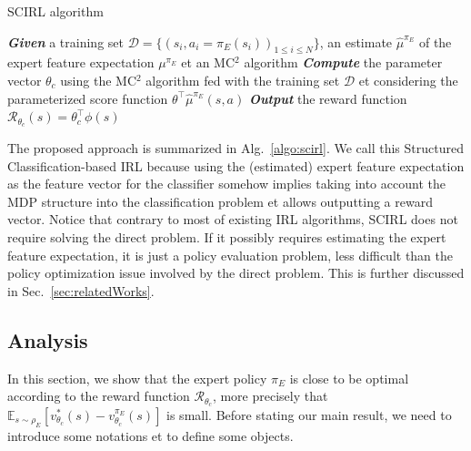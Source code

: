 \documentclass[english,utf8]{./hermes-journal}
\newcommand{\R}{\mathcal{R}}
\newcommand{\D}{\mathcal{D}}
\newcommand{\E}{\mathbb{E}}
\begin{document}
\begin{algorithm2e}%
  \SetAlgoVlined
  \caption{SCIRL algorithm}
  \label{algo:scirl}
  \BlankLine
  \emph{\textbf{Given}} a training set $\D = \{(s_i,a_i=\pi_E(s_i))_{1\leq i\leq N}\}$,
  an estimate $\hat{\mu}^{\pi_E}$ of the expert feature expectation $\mu^{\pi_E}$ et an MC$^2$ algorithm\;
  \BlankLine
  \emph{\textbf{Compute}} the parameter vector $\theta_c$ using the
  MC$^2$ algorithm
  fed with the training set $\D$ et considering the parameterized score function
  $\theta^\top\hat{\mu}^{\pi_E}(s,a)$\;
  \BlankLine
  \emph{\textbf{Output}} the reward function $\R_{\theta_c}(s) = \theta_c^\top\phi(s)$ \;
\end{algorithm2e}

The proposed approach is summarized in Alg.~\ref{algo:scirl}. We
call this Structured Classification-based IRL because using the
(estimated) expert feature expectation as the feature vector for the
classifier somehow implies taking into account the MDP structure
into the classification problem et allows outputting a reward
vector. Notice that contrary to most of existing IRL
algorithms, SCIRL does not require solving the direct problem. If it
possibly requires estimating the expert feature expectation, it is
just a policy evaluation problem, less difficult than the policy
optimization issue involved by the direct problem. This is further
discussed in Sec.~\ref{sec:relatedWorks}.
%


\subsection{Analysis}
\label{subsec:scirl:analysis}

In this section, we show that the expert policy $\pi_E$ is close to
be optimal according to the reward function $\R_{\theta_c}$, more
precisely that
$\E_{s\sim\rho_E}[v^*_{\theta_c}(s)-v^{\pi_E}_{\theta_c}(s)]$ is
small. Before stating our main result, we need to introduce some
notations et to define some objects.
\end{document}
